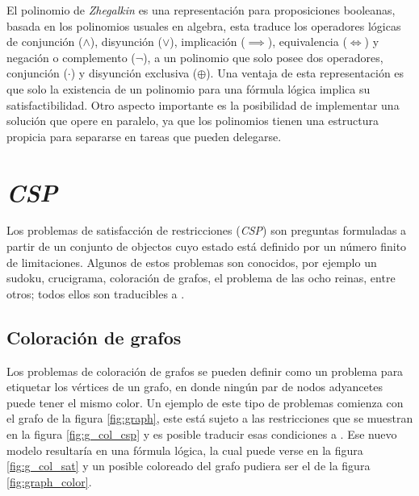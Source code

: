 El polinomio de \textit{Zhegalkin}\cite{zhegalkin} es una representación para proposiciones booleanas, basada en los polinomios usuales en algebra, esta traduce los operadores lógicas de conjunción ($\land$), disyunción ($\lor$), implicación ($\implies$), equivalencia ($\iff$) y negación o complemento ($\neg$), a un polinomio que solo posee dos operadores, conjunción ($\cdot$) y disyunción exclusiva ($\oplus$). Una ventaja de esta representación es que solo la existencia de un polinomio para una fórmula lógica implica su satisfactibilidad. Otro aspecto importante es la posibilidad de implementar una solución que opere en paralelo, ya que los polinomios tienen una estructura propicia para separarse en tareas que pueden delegarse.

\section{\textit{CSP}}

Los problemas de satisfacción de restricciones (\textit{CSP}) son preguntas formuladas a partir de un conjunto de objectos cuyo estado está definido por un número finito de limitaciones. Algunos de estos problemas son conocidos, por ejemplo un sudoku, crucigrama, coloración de grafos, el problema de las ocho reinas, entre otros; todos ellos son traducibles a \sat.


\subsection{Coloración de grafos}

Los problemas de coloración de grafos se pueden definir como un problema para etiquetar los vértices de un grafo, en donde ningún par de nodos adyancetes puede tener el mismo color. Un ejemplo de este tipo de problemas comienza con el grafo de la figura \ref{fig:graph}, este está sujeto a las restricciones que se muestran en la figura \ref{fig:g_col_csp} y es posible traducir esas condiciones a \sat. Ese nuevo modelo resultaría en una fórmula lógica, la cual puede verse en la figura \ref{fig:g_col_sat} y un posible coloreado del grafo pudiera ser el de la figura \ref{fig:graph_color}.

